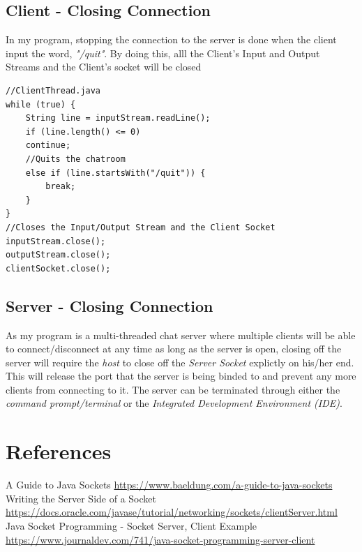 \documentclass[a4paper,11pt]{article}
\begin{document}
\subsection{Client - Closing Connection}
In my program, stopping the connection to the server is done when the client input the word, \textit{"/quit"}. By doing this, alll the Client's Input and Output Streams and the Client's socket will be closed 
\begin{mdframed}[backgroundcolor=light-gray, roundcorner=30pt,leftmargin=1, rightmargin=1, innerleftmargin=5, innertopmargin=-3,innerbottommargin=5, outerlinewidth=1, linecolor=light-gray]
\begin{lstlisting}
//ClientThread.java
while (true) {
	String line = inputStream.readLine();
	if (line.length() <= 0)
	continue;
	//Quits the chatroom
	else if (line.startsWith("/quit")) {
		break;
	}
}
//Closes the Input/Output Stream and the Client Socket
inputStream.close();
outputStream.close();
clientSocket.close();
\end{lstlisting}
\end{mdframed}

\subsection{Server - Closing Connection}
As my program is a multi-threaded chat server where multiple clients will be able to connect/disconnect at any time as long as the server is open, closing off the server will require the \textit{host} to close off the \textit{Server Socket} explictly on his/her end. This will release the port that the server is being binded to and prevent any more clients from connecting to it. The server can be terminated through either the \textit{command prompt/terminal} or the \textit{Integrated Development Environment (IDE)}.

\section{References}
\noindent [1] A Guide to Java Sockets
\newline
\underline{https://www.baeldung.com/a-guide-to-java-sockets}
\newline
\newline
[2] Writing the Server Side of a Socket
\newline
\underline{https://docs.oracle.com/javase/tutorial/networking/sockets/clientServer.html}
\newline
\newline
[3] Java Socket Programming - Socket Server, Client Example
\newline
\underline{https://www.journaldev.com/741/java-socket-programming-server-client}
\end{document}
